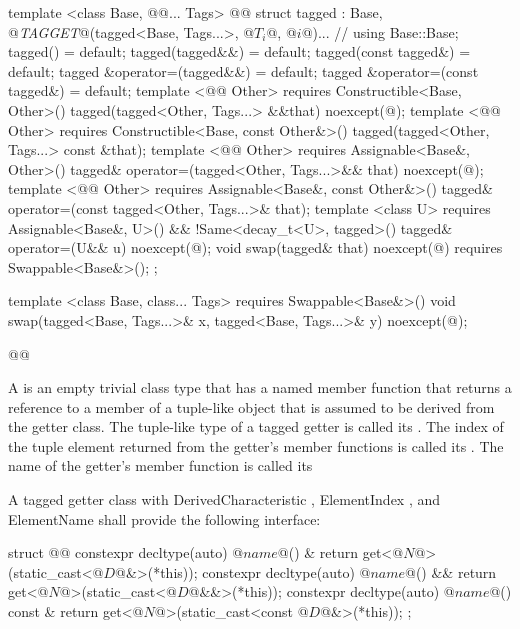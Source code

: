 {\begin{codeblock}
{{{  template <class Base, @@... Tags>
    @@
  struct tagged :
    Base, @\textit{TAGGET}@(tagged<Base, Tags...>, @$T_i$@, @$i$@)... { // \seebelow
    using Base::Base;
    tagged() = default;
    tagged(tagged&&) = default;
    tagged(const tagged&) = default;
    tagged &operator=(tagged&&) = default;
    tagged &operator=(const tagged&) = default;
    template <@@ Other>
      requires Constructible<Base, Other>()
    tagged(tagged<Other, Tags...> &&that) noexcept(@\seebelow@);
    template <@@ Other>
      requires Constructible<Base, const Other&>()
    tagged(tagged<Other, Tags...> const &that);
    template <@@ Other>
      requires Assignable<Base&, Other>()
    tagged& operator=(tagged<Other, Tags...>&& that) noexcept(@\seebelow@);
    template <@@ Other>
      requires Assignable<Base&, const Other&>()
    tagged& operator=(const tagged<Other, Tags...>& that);
    template <class U>
      requires Assignable<Base&, U>() && !Same<decay_t<U>, tagged>()
    tagged& operator=(U&& u) noexcept(@\seebelow@);
    void swap(tagged& that) noexcept(@\seebelow@)
      requires Swappable<Base&>();
  };

  template <class Base, class... Tags>
    requires Swappable<Base&>()
  void swap(tagged<Base, Tags...>& x, tagged<Base, Tags...>& y) noexcept(@\seebelow@);
}}}@\newtxt{\}}@
\end{codeblock}

\pnum {}

\pnum A  is an empty trivial class type that has a named member function that
returns a reference to a member of a tuple-like object that is assumed to be derived from the getter
class. The tuple-like type of a tagged getter is called its .
The index of the tuple element returned from the getter's member functions is called its
. The name of the getter's member function is called its

\pnum A tagged getter class with DerivedCharacteristic , ElementIndex
, and ElementName  shall provide the following interface:

\begin{codeblock}
struct @@ {
  constexpr decltype(auto) @$name$@() &       { return get<@$N$@>(static_cast<@$D$@&>(*this)); }
  constexpr decltype(auto) @$name$@() &&      { return get<@$N$@>(static_cast<@$D$@&&>(*this)); }
  constexpr decltype(auto) @$name$@() const & { return get<@$N$@>(static_cast<const @$D$@&>(*this)); }
};
\end{codeblock}

}
